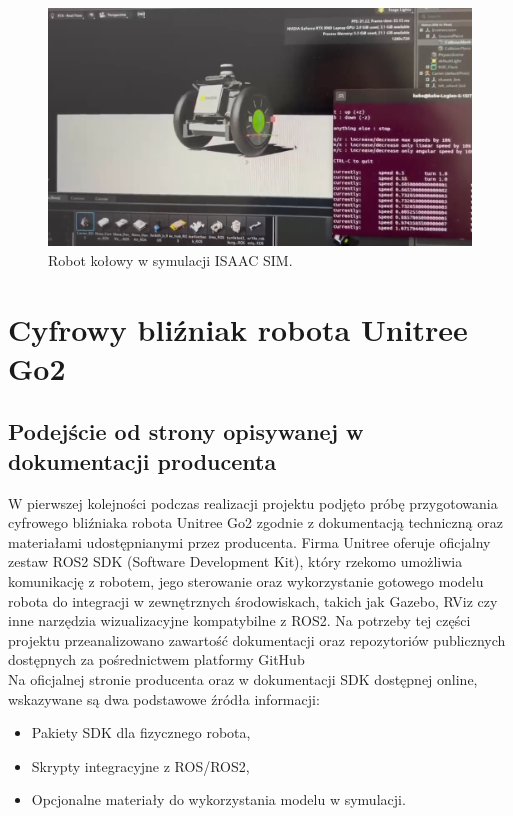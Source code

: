\documentclass[12pt]{article}
\begin{document}
\begin{figure}[h]
    \centering
    \includegraphics[width=0.8\linewidth]{Zdjęcia/robocikRos2.png}
    \caption{Robot kołowy w symulacji ISAAC SIM.}
    \label{fig:robotKolowy}
\end{figure}


\section{Cyfrowy bliźniak robota Unitree Go2}

\subsection{Podejście od strony opisywanej w dokumentacji producenta}

\noindent W pierwszej kolejności podczas realizacji projektu podjęto próbę przygotowania cyfrowego bliźniaka robota Unitree Go2 zgodnie z dokumentacją techniczną oraz materiałami udostępnianymi przez producenta. Firma Unitree oferuje oficjalny zestaw ROS2 SDK (Software Development Kit), który rzekomo umożliwia komunikację z robotem, jego sterowanie oraz wykorzystanie gotowego modelu robota do integracji w zewnętrznych środowiskach, takich jak Gazebo, RViz czy inne narzędzia wizualizacyjne kompatybilne z ROS2. Na potrzeby tej części projektu przeanalizowano zawartość dokumentacji oraz repozytoriów publicznych dostępnych za pośrednictwem platformy GitHub\\

\noindent Na oficjalnej stronie producenta oraz w dokumentacji SDK dostępnej online, wskazywane są dwa podstawowe źródła informacji:

\begin{itemize}
    \item Pakiety SDK dla fizycznego robota,
    \item Skrypty integracyjne z ROS/ROS2,
    \item Opcjonalne materiały do wykorzystania modelu w symulacji. 
\end{itemize}
\end{document}
